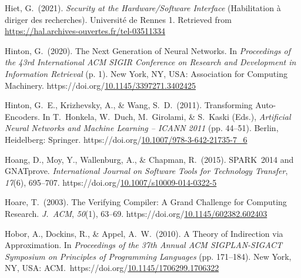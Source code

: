 \documentclass[12pt,twoside]{article}
\begin{document}
{\begin{thebibliography}{1079}
\mdbibitemlabel{}Hiet, G.~(2021). \emph{Security at the Hardware/Software Interface} (Habilitation à diriger des recherches). Université de Rennes 1. Retrieved from \href{https://hal.archives-ouvertes.fr/tel-03511334}{{\ttfamily https://\hspace{0pt}hal.\hspace{0pt}archives-\hspace{0pt}ouvertes.\hspace{0pt}fr/\hspace{0pt}tel-\hspace{0pt}03511334}}%

\mdbibitemlabel{}Hinton, G.~(2020). The Next Generation of Neural Networks. In \emph{Proceedings of the 43rd International ACM SIGIR Conference on Research and Development in Information Retrieval} (p. 1). New York, NY, USA: Association for Computing Machinery. https://doi.org/\href{https://dx.doi.org/10.1145/3397271.3402425}{10.1145/3397271.3402425}%

\mdbibitemlabel{}Hinton, G.~E., Krizhevsky, A., \& Wang, S.~D.~(2011). Transforming Auto-Encoders. In T.~Honkela, W.~Duch, M.~Girolami, \& S.~Kaski (Eds.), \emph{Artificial Neural Networks and Machine Learning – ICANN 2011} (pp. 44–51). Berlin, Heidelberg: Springer. https://doi.org/\href{https://dx.doi.org/10.1007/978-3-642-21735-7_6}{10.1007/978-3-642-21735-7\_6}%

\mdbibitemlabel{}Hoang, D., Moy, Y., Wallenburg, A., \& Chapman, R.~(2015). SPARK 2014 and GNATprove. \emph{International Journal on Software Tools for Technology Transfer}, \emph{17}(6), 695–707. https://doi.org/\href{https://dx.doi.org/10.1007/s10009-014-0322-5}{10.1007/s10009-014-0322-5}%

\mdbibitemlabel{}Hoare, T.~(2003). The Verifying Compiler: A Grand Challenge for Computing Research. \emph{J.~ACM}, \emph{50}(1), 63–69. https://doi.org/\href{https://dx.doi.org/10.1145/602382.602403}{10.1145/602382.602403}%

\mdbibitemlabel{}Hobor, A., Dockins, R., \& Appel, A.~W.~(2010). A Theory of Indirection via Approximation. In \emph{Proceedings of the 37th Annual ACM SIGPLAN-SIGACT Symposium on Principles of Programming Languages} (pp. 171–184). New York, NY, USA: ACM.~https://doi.org/\href{https://dx.doi.org/10.1145/1706299.1706322}{10.1145/1706299.1706322}%


\end{thebibliography}}
\end{document}
